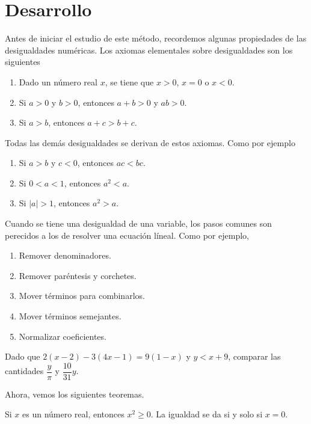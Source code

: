 \section{Desarrollo}

Antes de iniciar el estudio de este método, recordemos algunas propiedades de las desigualdades numéricas.
Los axiomas elementales sobre desigualdades son los siguientes

\begin{enumerate}
    \item Dado un número real $x$, se tiene que $x > 0$, $x = 0$ o $x < 0$.
    \item Si $a > 0$ y $b > 0$, entonces $a + b > 0$ y $ab > 0$.
    \item Si $a > b$, entonces $a + c > b + c$.
\end{enumerate}
Todas las demás desigualdades se derivan de estos axiomas.
Como por ejemplo
\begin{enumerate}
    \item Si $a > b$ y $c < 0$, entonces $ac < bc$.
    \item Si $0 < a < 1$, entonces $a^2 < a$.
    \item Si $|a| > 1$, entonces $a^2 > a$.
\end{enumerate}

Cuando se tiene una desigualdad de una variable, los pasos comunes son perecidos a los de resolver una ecuación líneal.
Como por ejemplo,
\begin{multicols}{2}
    \begin{enumerate}
        \item Remover denominadores.
        \item Remover paréntesis y corchetes.
        \item Mover términos para combinarlos.
        \item Mover términos semejantes.
        \item Normalizar coeficientes.
    \end{enumerate}
\end{multicols}

\begin{example}
    Dado que $2(x - 2) - 3(4x - 1) = 9(1 - x)$ y $y < x + 9$, comparar las cantidades $\dfrac{y}{\pi}$ y $\dfrac{10}{31}y$.
\end{example}


Ahora, vemos los siguientes teoremas.

\begin{theorem.box}{}{}
    Si $x$ es un número real, entonces $x^2 \geq 0$.
    La igualdad se da si y solo si $x = 0$.
\end{theorem.box}

